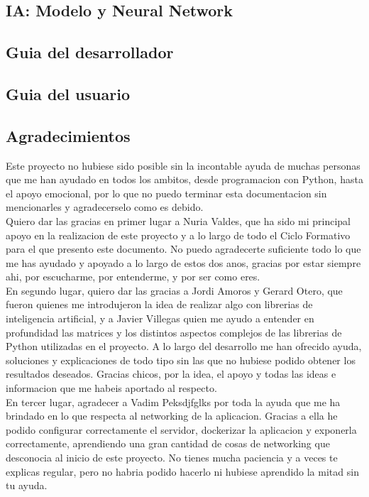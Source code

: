 \documentclass{article}
\begin{document}
\subsection{IA: Modelo y Neural Network}

\subsection{Guia del desarrollador}

\subsection{Guia del usuario}

\newpage
\subsection{Agradecimientos}
Este proyecto no hubiese sido posible sin la incontable ayuda de muchas personas que me han ayudado en todos los ambitos, desde programacion con Python, hasta el apoyo emocional, por lo que no puedo terminar esta documentacion sin mencionarles y agradecerselo como es debido.\\

Quiero dar las gracias en primer lugar a Nuria Valdes, que ha sido mi principal apoyo en la realizacion de este proyecto y a lo largo de todo el Ciclo Formativo para el que presento este documento. 
No puedo agradecerte suficiente todo lo que me has ayudado y apoyado a lo largo de estos dos anos, gracias por estar siempre ahi, por escucharme, por entenderme, y por ser como eres.\\

En segundo lugar, quiero dar las gracias a Jordi Amoros y Gerard Otero, que fueron quienes me introdujeron la idea de realizar algo con librerias de inteligencia artificial, y a Javier Villegas quien me ayudo a entender en profundidad las matrices y los distintos aspectos complejos de las librerias de Python utilizadas en el proyecto. A lo largo del desarrollo me han ofrecido ayuda, soluciones y explicaciones de todo tipo sin las que no hubiese podido obtener los resultados deseados. 
Gracias chicos, por la idea, el apoyo y todas las ideas e informacion que me habeis aportado al respecto.\\

En tercer lugar, agradecer a Vadim Peksdjfglks por toda la ayuda que me ha brindado en lo que respecta al networking de la aplicacion. Gracias a ella he podido configurar correctamente el servidor, dockerizar la aplicacion y exponerla correctamente, aprendiendo una gran cantidad de cosas de networking que desconocia al inicio de este proyecto. 
No tienes mucha paciencia y a veces te explicas regular, pero no habria podido hacerlo ni hubiese aprendido la mitad sin tu ayuda.\\
\end{document}
